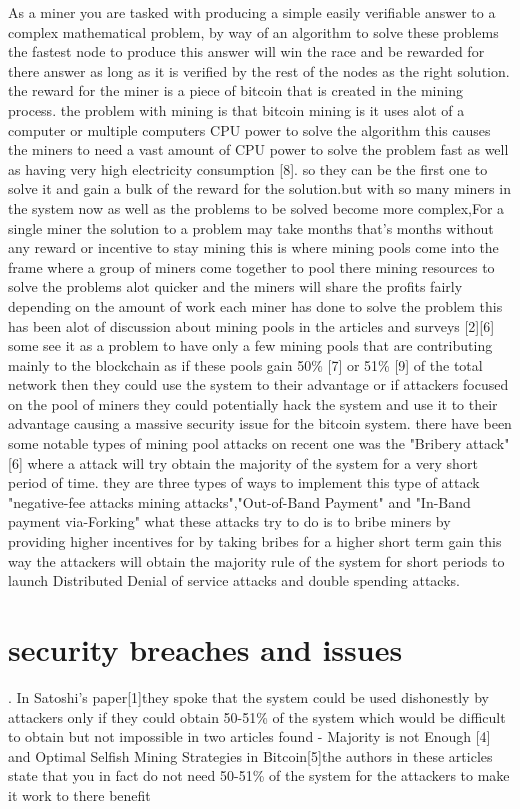 \documentclass[report]{IEEEtran}
\begin{document}
 As a miner you are tasked with producing a simple easily verifiable answer to a complex mathematical problem, by way of an algorithm to solve these problems the fastest node to produce this answer will win the race and be rewarded for there answer as long as it is verified by the rest of the nodes as the right solution. the reward for the miner is a piece of bitcoin that is created in the  mining process. the problem with mining is that bitcoin mining is it uses alot of a computer or multiple computers CPU power to solve the algorithm this causes the miners to need a vast amount of CPU power to solve the problem fast as well as having very high electricity consumption [8]. so they can be the first one to solve it and gain a bulk of the reward for the solution.but with so many miners in the system now as well as the problems to be solved become more complex,For a single miner the solution to a problem may take months that's months without any reward or incentive to stay mining this is where mining pools come into the frame where a group of miners come together to pool there mining resources to solve the problems alot quicker and the miners will share the profits fairly depending on the amount of work each miner has done to solve the problem this has been alot of discussion about mining pools in the articles and surveys [2][6] some see it as a problem to have only a few mining pools that are contributing mainly to the blockchain as if these pools gain 50\% [7] or 51\% [9] of the total network then they could use the system to their advantage or if attackers focused on the pool of miners they could potentially hack the system and use it to their advantage causing a massive security issue for the bitcoin system. there have been some notable types of mining pool attacks on recent one was the "Bribery attack"[6] where a attack will try obtain the majority of the system for a very short period of time. they are three types of ways to implement this type of attack "negative-fee attacks mining attacks","Out-of-Band Payment" and "In-Band payment via-Forking" what these attacks try to do is to bribe miners by providing higher incentives for by taking bribes for a higher short term gain this way the attackers will obtain the majority rule of the system for short periods to launch Distributed Denial of service attacks and double spending attacks.  

\section{security breaches and issues}.\newline
In Satoshi's paper[1]they spoke that the system  could be used dishonestly by attackers only if they could obtain 50-51\% of the system which would be difficult to obtain but not impossible in two articles found -  Majority is not Enough [4] and Optimal Selfish Mining Strategies in Bitcoin[5]the authors in these articles state that you in fact do not need 50-51\% of the system for the attackers to make it work to there benefit 
\end{document}
